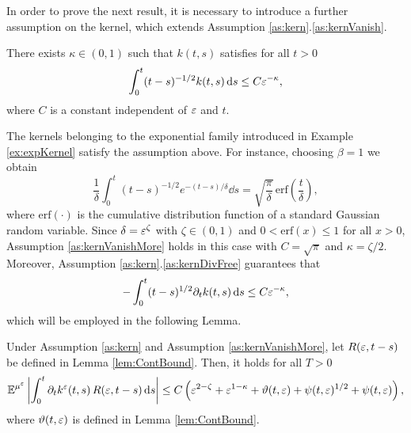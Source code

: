 \documentclass[10pt]{article}
\begin{document}
In order to prove the next result, it is necessary to introduce a further assumption on the kernel, which extends Assumption \ref{as:kern}.\ref{as:kernVanish}.
\begin{assumption}\label{as:kernVanishMore} There exists $\kappa \in (0, 1)$ such that $k(t, s)$ satisfies for all $t > 0$
	\begin{equation}
		\int_0^t (t-s)^{-1/2} k(t, s) \,\mathrm{d} s \leq C \varepsilon^{-\kappa},
	\end{equation}
	where $C$ is a constant independent of $\varepsilon$ and $t$.
\end{assumption}
\begin{remark} The kernels belonging to the exponential family introduced in Example \ref{ex:expKernel} satisfy the assumption above. For instance, choosing $\beta = 1$ we obtain
\begin{equation}
	\frac1\delta \int_0^t (t-s)^{-1/2} e^{-(t-s)/\delta} \dd s = \sqrt{\frac{\pi}{\delta}} \, \mathrm{erf}\left(\frac{t}{\delta}\right),
\end{equation}
where $\mathrm{erf}(\cdot)$ is the cumulative distribution function of a standard Gaussian random variable. Since $\delta = \varepsilon^\zeta$ with $\zeta \in (0, 1)$ and $0 < \mathrm{erf}(x) \leq 1$ for all $x > 0$, Assumption \ref{as:kernVanishMore} holds in this case with $C = \sqrt{\pi}$ and $\kappa = \zeta / 2$. Moreover, Assumption \ref{as:kern}.\ref{as:kernDivFree} guarantees that
\begin{equation}
	-\int_0^t (t-s)^{1/2} \partial_t k(t, s) \,\mathrm{d} s \leq C \varepsilon^{-\kappa},
\end{equation}
which will be employed in the following Lemma. \end{remark}
\begin{lemma}\label{lem:TechBound} Under Assumption \ref{as:kern} and Assumption \ref{as:kernVanishMore}, let $R(\varepsilon, t-s)$ be defined in Lemma \ref{lem:ContBound}. Then, it holds for all $T > 0$
	\begin{equation}
	\operatorname{\mathbb{E}}^{\mu^\varepsilon} \left\lvert\int_0^t \partial_t k^\varepsilon(t, s) \, R(\varepsilon, t-s) \,\mathrm{d} s\right\rvert \leq C \left(\varepsilon^{2-\zeta} + \varepsilon^{1-\kappa} + \vartheta(t, \varepsilon) + \psi(t, \varepsilon)^{1/2} + \psi(t, \varepsilon)\right),
	\end{equation}
	where $\vartheta(t, \varepsilon)$ is defined in Lemma \ref{lem:ContBound}.
\end{lemma} 
\end{document}
